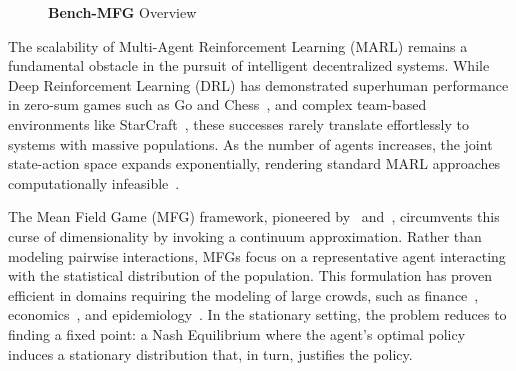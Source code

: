 \documentclass[10pt,twocolumn,letterpaper]{article}
\theoremstyle{definition}
\theoremstyle{remark}
\begin{document}
\begin{figure}[t]
{
    }
    \caption{\small \textbf{Bench-MFG} Overview}
    \vspace{-0.5cm}
\end{figure}
The scalability of Multi-Agent Reinforcement Learning (MARL) remains a fundamental obstacle in the pursuit of intelligent decentralized systems. While Deep Reinforcement Learning (DRL) has demonstrated superhuman performance in zero-sum games such as Go and Chess~\citep{silver2016mastering,silver2017masteringchess}, and complex team-based environments like StarCraft~\citep{samvelyan2019starcraft}, these successes rarely translate effortlessly to systems with massive populations. As the number of agents increases, the joint state-action space expands exponentially, rendering standard MARL approaches computationally infeasible~\citep{busoniu2008comprehensive,yang2020overview,zhang2021multi}.

The Mean Field Game (MFG) framework, pioneered by~\citet{MR2295621} and~\citet{huang2006largeMKV}, circumvents this curse of dimensionality by invoking a continuum approximation. Rather than modeling pairwise interactions, MFGs focus on a representative agent interacting with the statistical distribution of the population. This formulation has proven efficient in domains requiring the modeling of large crowds, such as finance~\citep{cardaliaguet2018mean,carmona2017mean}, economics~\citep{MR2647032,achdou2022income}, and epidemiology~\citep{laguzet2015individual,olmez2022modeling,aurell2022optimal}. In the stationary setting, the problem reduces to finding a fixed point: a Nash Equilibrium where the agent's optimal policy induces a stationary distribution that, in turn, justifies the policy.
\end{document}
